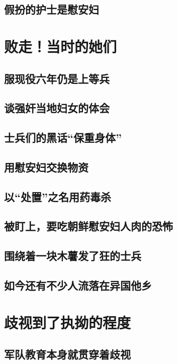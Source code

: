 \documentclass[12pt,UTF8]{ctexbook}
\begin{document}
\section{假扮的护士是慰安妇}

\chapter{败走！当时的她们}

\section{服现役六年仍是上等兵}

\section{谈强奸当地妇女的体会}

\section{士兵们的黑话“保重身体”}

\section{用慰安妇交换物资}

\section{以“处置”之名用药毒杀}

\section{被盯上，要吃朝鲜慰安妇人肉的恐怖}

\section{围绕着一块木薯发了狂的士兵}

\section{如今还有不少人流落在异国他乡}

\chapter{歧视到了执拗的程度}

\section{军队教育本身就贯穿着歧视}
\end{document}
